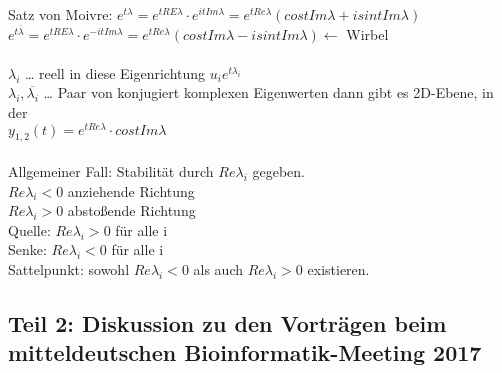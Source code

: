 Satz von Moivre: $e^{t \lambda} = e^{t RE \lambda} \cdot e^{i t Im \lambda} = e^{t Re \lambda} (cos t Im \lambda + i sin t Im \lambda)$\\
$e^{t \overline{\lambda}} = e^{t RE \lambda} \cdot e^{- i t Im \lambda} = e^{t Re \lambda} (cos t Im \lambda - i sin t Im \lambda) \leftarrow$ Wirbel\\\\

$\lambda_i$ … reell in diese Eigenrichtung $u_i e^{t \lambda_i}$\\
$\lambda_i, \overline{\lambda_i}$ … Paar von konjugiert komplexen Eigenwerten dann gibt es 2D-Ebene, in der \\
$y_{1,2}(t)=e^{t Re \lambda} \cdot cos t Im \lambda$\\\\


Allgemeiner Fall: Stabilität durch $Re \lambda_i$ gegeben.\\
$Re \lambda_i < 0$ anziehende Richtung\\
$Re \lambda_i > 0$ abstoßende Richtung\\
Quelle: $Re \lambda_i > 0$ für alle i\\
Senke: $Re \lambda_i < 0$ für alle i\\
Sattelpunkt: sowohl $Re \lambda_i < 0$ als auch $Re \lambda_i > 0$ existieren.

\subsection{Teil 2: Diskussion zu den Vorträgen beim mitteldeutschen Bioinformatik-Meeting 2017}